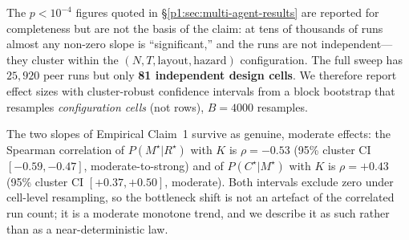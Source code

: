 \documentclass{article}
\begin{document}
The $p<10^{-4}$ figures quoted in \S\ref{p1:sec:multi-agent-results} are reported for completeness but are not the basis of the claim: at tens of thousands of runs almost any non-zero slope is ``significant,'' and the runs are not independent---they cluster within the $(N,T,\text{layout},\text{hazard})$ configuration. The full sweep has $25{,}920$ peer runs but only \textbf{81 independent design cells}. We therefore report effect sizes with cluster-robust confidence intervals from a block bootstrap that resamples \emph{configuration cells} (not rows), $B{=}4000$ resamples.

The two slopes of Empirical Claim~1 survive as genuine, moderate effects: the Spearman correlation of $P(M^\star|R^\star)$ with $K$ is $\rho=-0.53$ (95\% cluster CI $[-0.59,-0.47]$, moderate-to-strong) and of $P(C^\star|M^\star)$ with $K$ is $\rho=+0.43$ (95\% cluster CI $[+0.37,+0.50]$, moderate). Both intervals exclude zero under cell-level resampling, so the bottleneck shift is not an artefact of the correlated run count; it is a moderate monotone trend, and we describe it as such rather than as a near-deterministic law.
\end{document}
